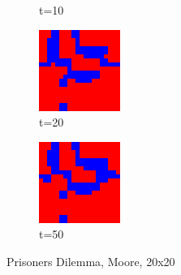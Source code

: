\documentclass[a4paper, 11pt]{article}
\begin{document}
\begin{figure}[H]
\begin{subfigure}{.16\textwidth}
  \caption{t=10}
\end{subfigure}%
\begin{subfigure}{.16\textwidth}
  \centering
  \includegraphics[width=0.9\linewidth]{PRISONERS_DILEMMA_MOORE_20x20_t20}
  \caption{t=20}
\end{subfigure}%
\begin{subfigure}{.16\textwidth}
  \centering
  \includegraphics[width=0.9\linewidth]{PRISONERS_DILEMMA_MOORE_20x20_t50}
  \caption{t=50}
\end{subfigure}
\caption{Prisoners Dilemma, Moore, 20x20}
\end{figure}
\end{document}
